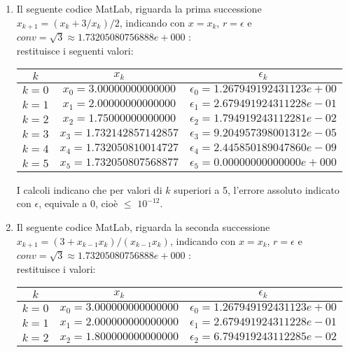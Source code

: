 \begin{enumerate}
	\item
		Il seguente codice MatLab, riguarda la prima successione $x_{k+1} = (x_k + 3/x_k)/2$, indicando con $x=x_k$, $r=\epsilon$ e $conv = \sqrt{3} \approx 1.73205080756888e+000$ :\\
		
		restituisce i seguenti valori:\\
		\begin{center}
			\begin{tabular}{|c|c|c|}
			\hline
				$k$ & $x_k$ & $\epsilon_k$ \\
			\hline
    			$k=0$ & $x_0 = 3.00000000000000$ & $\epsilon_0 = 1.267949192431123e+00$\\
    			$k=1$ & $x_1 = 2.00000000000000$ & $\epsilon_1 =  2.679491924311228e-01$\\
    			$k=2$ & $x_2 = 1.75000000000000$ & $\epsilon_2 = 1.794919243112281e-02$\\
    			$k=3$ & $x_3 = 1.732142857142857$ & $\epsilon_3 = 9.204957398001312e-05$\\
    			$k=4$ & $x_4 = 1.732050810014727$ & $\epsilon_4 = 2.445850189047860e-09$\\
    			$k=5$ & $x_5 = 1.732050807568877$ & $\epsilon_5 = 0.00000000000000e+000$\\
			\hline
			\end{tabular}
		\end{center}
		I calcoli indicano che per valori di $k$ superiori a 5, l'errore assoluto indicato con $\epsilon$, equivale a $0$, cioè $\leq$ \(10^{-12}\).\\
	\item
		Il seguente codice MatLab, riguarda la seconda successione $x_{k+1} = (3+x_{k-1}x_k)/(x_{k-1}x_k)$, indicando con $x=x_k$, $r=\epsilon$ e $conv = \sqrt{3} \approx 1.73205080756888e+000$ :\\
		
		restituisce i valori:\\
		\begin{center}
			\begin{tabular}{|c|c|c|}
			\hline
				$k$ & $x_k$ & $\epsilon_k$ \\
			\hline
    			$k=0$ & $x_0 = 3.000000000000000$ & $\epsilon_0 = 1.267949192431123e+00$\\
    			$k=1$ & $x_1 = 2.000000000000000$ & $\epsilon_1 = 2.679491924311228e-01$\\
    			$k=2$ & $x_2 = 1.800000000000000$ & $\epsilon_2 = 6.794919243112285e-02$\\

\end{tabular}
\end{center}
\end{enumerate}
